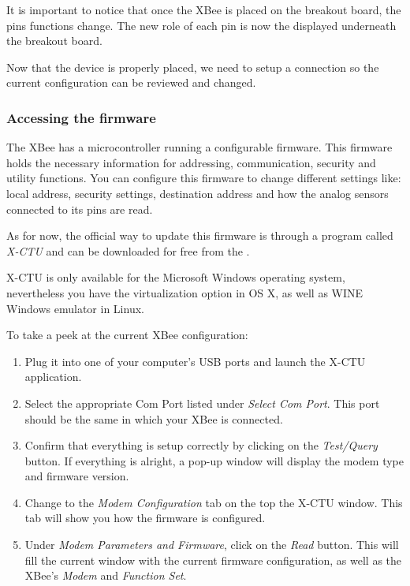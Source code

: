 It is important to notice that once the XBee is placed on the breakout board, the pins functions change. The new role of each pin is now the displayed underneath the breakout board.

Now that the device is properly placed, we need to setup a connection so the current configuration can be reviewed and changed.

\subsubsection{Accessing the firmware}

The XBee has a microcontroller running a configurable firmware. This firmware holds the necessary information for addressing, communication, security and utility functions. You can configure this firmware to change different settings like: local address, security settings, destination address and how the analog sensors connected to its pins are read.

As for now, the official way to update this firmware is through a program called \emph{X-CTU} and can be downloaded for free from the \emph{}.

X-CTU is only available for the Microsoft Windows operating system, nevertheless you have the virtualization option in OS X, as well as WINE Windows emulator in Linux. 

To take a peek at the current XBee configuration: 

\begin{enumerate}
	\item Plug it into one of your computer's USB ports and launch the X-CTU application.
	\item Select the appropriate Com Port listed under \emph{Select Com Port}. This port should be the same in which your XBee is connected.
	\item Confirm that everything is setup correctly by clicking on the \emph{Test/Query} button. If everything is alright, a pop-up window will display the modem type and firmware version.
	\item Change to the \emph{Modem Configuration} tab on the top the X-CTU window. This tab will show you how the firmware is configured.
	\item Under \emph{Modem Parameters and Firmware}, click on the \emph{Read} button. This will fill the current window with the current firmware configuration, as well as the XBee's \emph{Modem} and \emph{Function Set}.
\end{enumerate}

